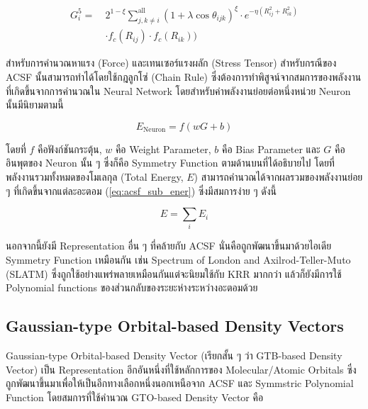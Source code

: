 \begin{align}
    G^{5}_{i} =~&2^{1 - \xi}\sum^{\text{all}}_{j,k \neq i} (1+\lambda \cos \theta_{ijk})^{\xi}
    \cdot e^{-\eta(R^{2}_{ij} + R^{2}_{ik})} \nonumber \\
    & \cdot f_{c}(R_{ij}) \cdot f_{c}(R_{ik}))
\end{align}

สำหรับการคำนวณหาแรง (Force) และเทนเซอร์แรงผลัก (Stress Tensor) สำหรับกรณีของ ACSF นั้นสามารถทำได้โดยใช้กฎลูกโซ่ (Chain Rule) 
ซึ่งต้องการทำพิสูจน์จากสมการของพลังงานที่เกิดขึ้นจากการคำนวณใน Neural Network โดยสำหรับค่าพลังงานย่อยต่อหนึ่งหน่วย Neuron นั้นมีนิยามตามนี้

\begin{equation}
    \label{eq:acsf_sub_ener}
    E_{\text{Neuron}} = f(w G + b) 
\end{equation}

\noindent โดยที่ $f$ คือฟังก์ชันกระตุ้น, $w$ คือ Weight Parameter, $b$ คือ Bias Parameter และ $G$ คืออินพุตของ Neuron นั้น ๆ 
ซึ่งก็คือ Symmetry Function ตามด้านบนที่ได้อธิบายไป โดยที่พลังงานรวมทั้งหมดของโมเลกุล (Total Energy, $E$) 
สามารถคำนวณได้จากผลรวมของพลังงานย่อย ๆ ที่เกิดขึ้นจากแต่ละอะตอม (\ref{eq:acsf_sub_ener}) ซึ่งมีสมการง่าย ๆ ดังนี้

\begin{equation}
    E = \sum_{i} E_{i}
\end{equation}

นอกจากนี้ยังมี Representation อื่น ๆ ที่คล้ายกับ ACSF นั่นคือถูกพัฒนาขึ้นมาด้วยไอเดีย Symmetry Function เหมือนกัน เช่น 
Spectrum of London and Axilrod-Teller-Muto (SLATM) ซึ่งถูกใช้อย่างแพร่พลายเหมือนกันแต่จะนิยมใช้กับ KRR มากกว่า\cite{faber2018} 
แล้วก็ยังมีการใช้ Polynomial functions ของส่วนกลับของระยะห่างระหว่างอะตอมด้วย\cite{kwac2019,musil2021}

\subsection{Gaussian-type Orbital-based Density Vectors}

Gaussian-type Orbital-based Density Vector (เรียกสั้น ๆ ว่า GTB-based Density Vector) เป็น Representation 
อีกอันหนึ่งที่ใช้หลักการของ Molecular/Atomic Orbitals ซึ่งถูกพัฒนาขึ้นมาเพื่อให้เป็นอีกทางเลือกหนึ่งนอกเหนือจาก ACSF และ 
Symmstric Polynomial Function\cite{kwac2021} โดยสมการที่ใช้คำนวณ GTO-based Density Vector คือ

